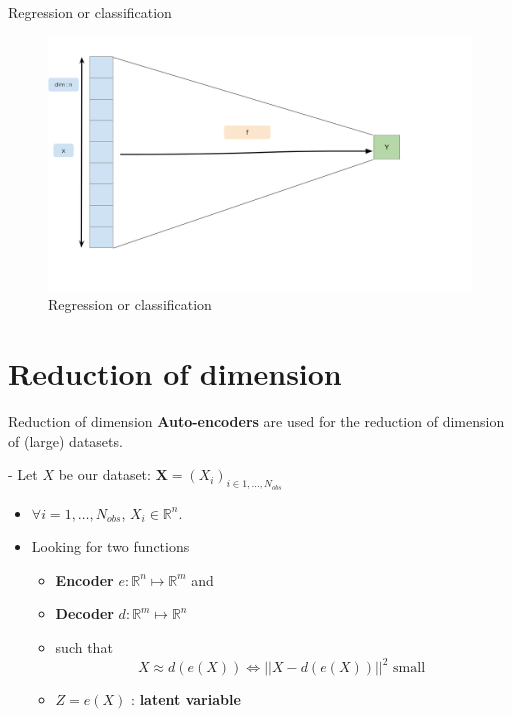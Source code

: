 \documentclass[
  12pt,
  ignorenonframetext,
  compress]{beamer}
\begin{document}
\begin{frame}{Regression or classification}
\begin{figure}

{\centering \includegraphics[width=0.9\linewidth]{images/RegressionClassification} 

}

\caption{Regression or classification}\label{fig:unnamed-chunk-1}
\end{figure}
\end{frame}

\begin{frame}
\end{frame}

\hypertarget{reduction-of-dimension}{%
\section{Reduction of dimension}\label{reduction-of-dimension}}

\begin{frame}{Reduction of dimension}
\textbf{Auto-encoders} are used for the reduction of dimension of
(large) datasets.

- Let \(X\) be our dataset:
\(\mathbf{X}=(X_i)_{i \in 1, \dots,N_{obs}}\)

\begin{itemize}
\item
  \(\forall i =1,\dots,N_{obs}\), \(X_i \in \mathbb{R}^n\).
\item
  Looking for two functions

  \begin{itemize}
  \item
    \textbf{Encoder} \(e :\mathbb{R}^n \mapsto \mathbb{R}^m\) and
  \item
    \textbf{Decoder} \(d :\mathbb{R}^m \mapsto \mathbb{R}^n\)
  \item
    such that
    \[X \approx d(e(X)) \Leftrightarrow ||X -   d(e(X)) ||^2 \mbox{ small } \]
  \item
    \(Z = e(X)\) : \textbf{latent variable}
  \end{itemize}
\end{itemize}
\end{frame}
\end{document}
